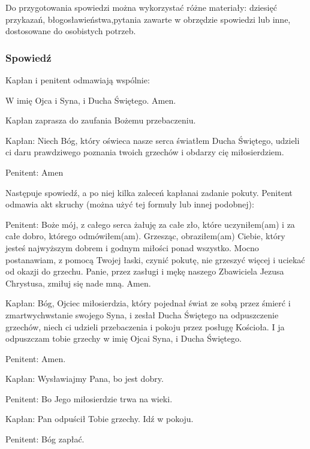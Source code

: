 ﻿\documentclass[9pt,twoside]{extarticle}
\newcommand{\gsss}[1]{
  \subsubsection*{#1}
  \addcontentsline{toc}{subsubsection}{#1}
}
\begin{document}
{\hnr Do przygotowania spowiedzi można wykorzystać różne materiały: dziesięć przykazań, błogosławieństwa,\linebreak pytania zawarte w obrzędzie spowiedzi lub inne, dostosowane do osobistych potrzeb.}


\gsss{Spowiedź}


{\hnr{}


Kapłan i penitent odmawiają wspólnie:}


W imię Ojca i Syna, i Ducha Świętego. Amen.


{\hnr Kapłan zaprasza do zaufania Bożemu przebaczeniu.}


{\hnr Kapłan:} Niech Bóg, który oświeca nasze serca światłem Ducha Świętego, udzieli ci daru prawdziwego poznania twoich grzechów i obdarzy cię miłosierdziem.


{\hnr Penitent:} Amen


{\hnr Następuje spowiedź, a po niej kilka zaleceń kapłana\linebreak i zadanie pokuty. Penitent odmawia akt skruchy (można użyć tej formuły lub innej podobnej):}


{\hnr{}}


{\hnr Penitent:} Boże mój, z całego serca żałuję za całe zło, które uczyniłem(am) i za całe dobro, którego odmówiłem(am). Grzesząc, obraziłem(am) Ciebie, który jesteś najwyższym dobrem i godnym miłości ponad wszystko. Mocno postanawiam, z pomocą Twojej łaski, czynić pokutę, nie grzeszyć więcej i uciekać od okazji do grzechu. Panie, przez zasługi i mękę naszego Zbawiciela Jezusa Chrystusa, zmiłuj się nade mną. Amen.


{\hnr{}}


{\hnr Kapłan:} Bóg, Ojciec miłosierdzia, który pojednał świat ze sobą przez śmierć i zmartwychwstanie swojego Syna, i zesłał Ducha Świętego na odpuszczenie grzechów, niech ci udzieli przebaczenia i pokoju przez posługę Kościoła. I ja odpuszczam tobie grzechy w imię Ojca\linebreak i Syna, i Ducha Świętego.


{\hnr Penitent:} Amen.


{\hnr{}}


{\hnr Kapłan:} Wysławiajmy Pana, bo jest dobry.


{\hnr Penitent:} Bo Jego miłosierdzie trwa na wieki.


{\hnr Kapłan:} Pan odpuścił Tobie grzechy. Idź w pokoju.


{\hnr Penitent:} Bóg zapłać.
\end{document}
